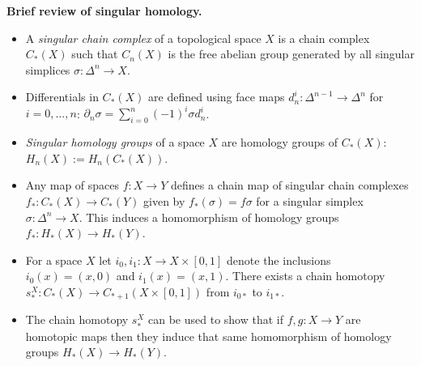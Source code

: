 \begin{nn}{\bf Brief review of singular homology.}
\begin{itemize}
\item A \emph{singular chain complex} of a topological space $X$ is a chain complex
$C_{\ast}(X)$ such that $C_{n}(X)$ is the free abelian group generated by all singular 
simplices $\sigma\colon \Delta^{n}\to X$. \\[-3mm]

\item  Differentials in $C_{\ast}(X)$ are defined using 
face maps $d^{i}_{n}\colon \Delta^{n-1}\to \Delta^{n}$ for $i=0, \dots, n$:
$\partial_{n}\sigma = \sum_{i=0}^{n} (-1)^{i}\sigma d^{i}_{n}$. \\[-3mm]


\item \emph{Singular homology groups} of a space $X$ are homology groups of $C_{\ast}(X)$:
$H_{n}(X) := H_{n}(C_{\ast}(X))$.  \\[-3mm]

\item Any map of spaces $f\colon X \to Y$ defines a chain map of singular chain complexes 
$f_{\ast}\colon C_{\ast}(X) \to C_{\ast}(Y)$ given by $f_{\ast}(\sigma) = f\sigma$
for a singular simplex $\sigma\colon \Delta^{n}\to X$. This induces a homomorphism of 
homology groups $f_{\ast}\colon H_{\ast}(X) \to H_{\ast}(Y)$. \\[-3mm]

\item For a space $X$ let $i_{0}, i_{1}\colon X \to X\times [0, 1]$ denote the inclusions 
$i_{0}(x) = (x, 0)$ and $i_{1}(x) = (x, 1)$. There exists a chain homotopy 
$s^{X}_{\ast}\colon C_{\ast}(X) \to C_{\ast +1}(X\times [0, 1])$ from $i_{0\ast}$
to $i_{1\ast}$.  \\[-3mm]

\item The chain homotopy $s^{X}_{\ast}$ can be used to show that if $f, g\colon X \to Y$
are homotopic maps then they induce that same homomorphism of homology groups 
$H_{\ast}(X) \to H_{\ast}(Y)$.

\end{itemize}
\end{nn}


